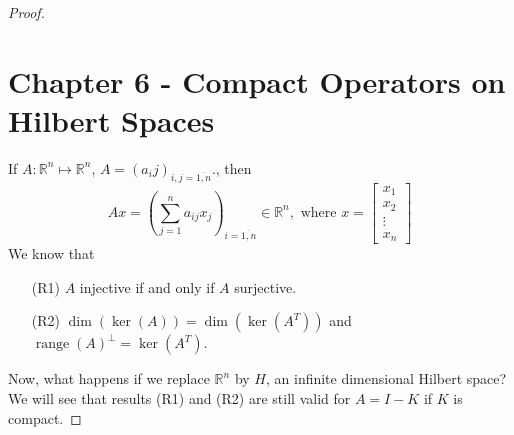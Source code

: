 \documentclass[oneside]{book}
\newcommand{\R}{{\mathbb R}}
\DeclareMathOperator{\range}{range}
\newcommand{\ov}{\overline}
\begin{document}
\begin{proof}
\section*{Chapter 6 - Compact Operators on Hilbert Spaces}
\setcounter{theorem}{0}
 \setcounter{proposition}{0}
  \setcounter{definition}{0}
 \setcounter{corollary}{0}
 \setcounter{cons}{0}
 \setcounter{equation}{0}
 \setcounter{lemma}{0}
If $A: \R^n \mapsto \R^n$, $A = (a_ij)_{i, j = \ov{1, n}}$., then 
\[ Ax = \left( \sum\limits_{j =1}^n a_{ij} x_j \right)_{i = \ov{1, n}} \in \R^n, \text{ where } x = \left[ \begin{matrix}
x_1 \\
x_2 \\
\vdots \\
x_n
\end{matrix}\right]\]
We know that 
\begin{enumerate}
\item[(R1)] $A$ injective if and only if $A$ surjective. 
\item[(R2)] $\dim(\ker(A)) = \dim(\ker(A^{T}))$ and $\range(A)^{\perp} = \ker(A^T)$.
\end{enumerate}
Now, what happens if we replace $\R^n$ by $H$, an infinite dimensional Hilbert space? We will see that results (R1) and (R2) are still valid for $A = I - K$ if $K$ is compact. 

\end{proof}
\end{document}
